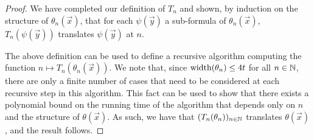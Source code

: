 \documentclass[../paper.tex]{subfiles}
\begin{document}
\begin{proof}
  We have completed our definition of $T_n$ and shown, by induction on the
  structure of $\theta_n(\vec{x})$, that for each $\psi (\vec{y})$ a sub-formula
  of $\theta_n(\vec{x})$, $T_n(\psi(\vec{y}))$ translates $\psi(\vec{y})$ at
  $n$.

  The above definition can be used to define a recursive algorithm computing the
  function $n \mapsto T_n (\theta_n(\vec{x}))$. We note that, since
  $\mathrm{width}(\theta_n) \leq 4 t$ for all $n \in \mathbb{N}$, there are only a finite
  number of cases that need to be considered at each recursive step in this
  algorithm. This fact can be used to show that there exists a polynomial bound
  on the running time of the algorithm that depends only on $n$ and the
  structure of $\theta(\vec{x})$. As such, we have that $(T_n (\theta_n))_{n \in
    \mathbb{N}}$ translates $\theta(\vec{x})$, and the result follows.
\end{proof}


\end{document}
